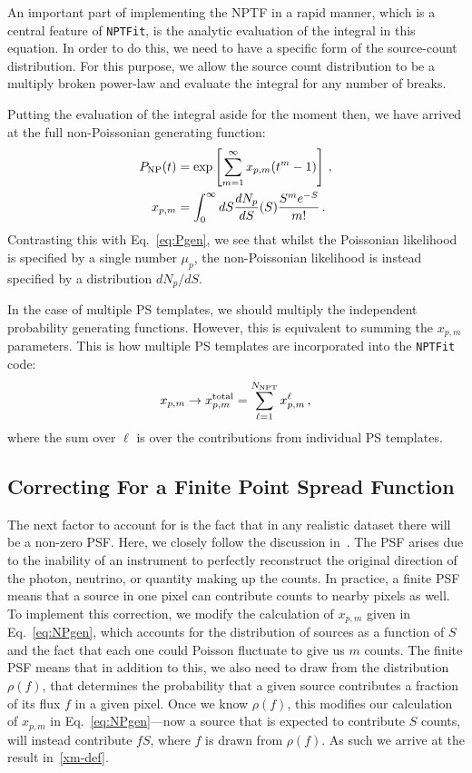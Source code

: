 An important part of implementing the NPTF in a rapid manner, which is a central feature of \texttt{NPTFit}, is the analytic evaluation of the integral in this equation. In order to do this, we need to have a specific form of the source-count distribution. For this purpose, we allow the source count distribution to be a multiply broken power-law and evaluate the integral for any number of breaks. %

Putting the evaluation of the integral aside for the moment then, we have arrived at the full non-Poissonian generating function:
\begin{equation}\begin{aligned}
P_{\rm NP}(t) &= \exp \left[ \sum_{m=1}^{\infty} x_{p,m} (t^m - 1) \right]\,, \\
x_{p,m} &= \int_0^{\infty} dS \frac{dN_p}{dS}(S) \frac{S^m e^{-S}}{m!}\,.
\label{eq:NPgen}
\end{aligned}\end{equation}
Contrasting this with Eq.~\eqref{eq:Pgen}, we see that whilst the Poissonian likelihood is specified by a single number $\mu_p$, the non-Poissonian likelihood is instead specified by a distribution $dN_p/dS$.

In the case of multiple PS templates, we should multiply the independent probability generating functions.  However, this is equivalent to summing the $x_{p,m}$ parameters.  This is how multiple PS templates are incorporated into the \texttt{NPTFit} code:
\begin{equation}
x_{p,m} \to x_{p,m}^{\rm total} = \sum_{\ell=1}^{N_{\rm NPT}} x_{p,m}^{\ell}\,,
\end{equation}
where the sum over $\ell$ is over the contributions from individual PS templates. 

\subsection{Correcting For a Finite Point Spread Function}
\label{subsec:psf}

The next factor to account for is the fact that in any realistic dataset there will be a non-zero PSF.  Here, we closely follow the discussion in~\cite{Malyshev:2011zi}. The PSF arises due to the inability of an instrument to perfectly reconstruct the original direction of the photon, neutrino, or quantity making up the counts. In practice, a finite PSF means that a source in one pixel can contribute counts to nearby pixels as well. To implement this correction, we modify the calculation of $x_{p,m}$ given in Eq.~\eqref{eq:NPgen}, which accounts for the distribution of sources as a function of $S$ and the fact that each one could Poisson fluctuate to give us $m$ counts. The finite PSF means that in addition to this, we also need to draw from the distribution $\rho(f)$, that determines the probability that a given source contributes a fraction of its flux $f$ in a given pixel. Once we know $\rho(f)$, this modifies our calculation of $x_{p,m}$ in Eq.~\eqref{eq:NPgen}---now a source that is expected to contribute $S$ counts, will instead contribute $f S$, where $f$ is drawn from $\rho(f)$. As such we arrive at the result in~\eqref{xm-def}.

